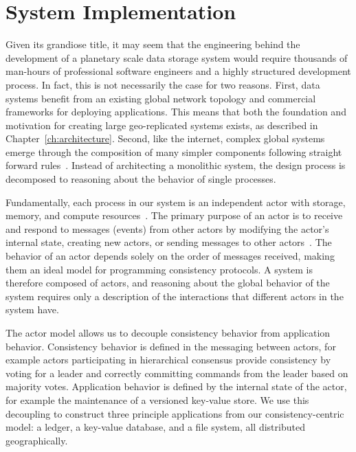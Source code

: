 
\renewcommand{\thechapter}{5}

\chapter{System Implementation}
\label{ch:system_implementation}

Given its grandiose title, it may seem that the engineering behind the development of a planetary scale data storage system would require thousands of man-hours of professional software engineers and a highly structured development process.
In fact, this is not necessarily the case for two reasons.
First, data systems benefit from an existing global network topology and commercial frameworks for deploying applications.
This means that both the foundation and motivation for creating large geo-replicated systems exists, as described in Chapter~\ref{ch:architecture}.
Second, like the internet, complex global systems emerge through the composition of many simpler components following straight forward rules~\cite{internet}.
Instead of architecting a monolithic system, the design process is decomposed to reasoning about the behavior of single processes.

Fundamentally, each process in our system is an independent actor with storage, memory, and compute resources~\cite{actors,scala_actors,orleans}.
The primary purpose of an actor is to receive and respond to messages (events) from other actors by modifying the actor's internal state, creating new actors, or sending messages to other actors~\cite{hewitt_actors}.
The behavior of an actor depends solely on the order of messages received, making them an ideal model for programming consistency protocols.
A system is therefore composed of actors, and reasoning about the global behavior of the system requires only a description of the interactions that different actors in the system have.

The actor model allows us to decouple consistency behavior from application behavior.
Consistency behavior is defined in the messaging between actors, for example actors participating in hierarchical consensus provide consistency by voting for a leader and correctly committing commands from the leader based on majority votes.
Application behavior is defined by the internal state of the actor, for example the maintenance of a versioned key-value store.
We use this decoupling to construct three principle applications from our consistency-centric model: a ledger, a key-value database, and a file system, all distributed geographically.


